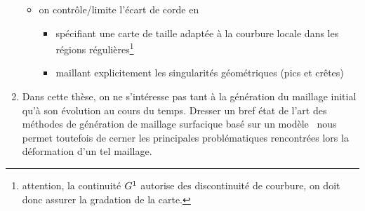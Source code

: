 \begin{enumerate}
\begin{itemize}[label=$\rightarrow$]
        \item on contrôle/limite l'écart de corde en
        \begin{itemize}
            \item spécifiant une carte de taille adaptée à la courbure locale dans les régions régulières\footnote{attention, la continuité $G^{1}$ autorise des discontinuité de courbure, on doit donc assurer la gradation de la carte.}
            \item \label{item:discretisation_singularites} maillant explicitement les singularités géométriques (pics et crêtes)
        \end{itemize}
    \end{itemize}
    
    \item Dans cette thèse, on ne s'intéresse pas tant à la génération du maillage initial %
    qu'à son évolution au cours du temps. 
	Dresser un bref état de l'art des méthodes de génération de maillage surfacique basé sur un modèle \brep\ nous permet toutefois de cerner les principales problématiques rencontrées lors la déformation d'un tel maillage.
\end{enumerate}


